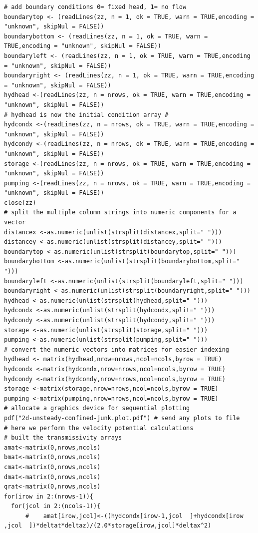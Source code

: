 \begin{lstlisting}[caption= Listing for \textbf{R} implementation for unsteady unconfined flow using Jacobi iteration , label=lst:2DUnsteadyUnconfined]
# add boundary conditions 0= fixed head, 1= no flow
boundarytop <- (readLines(zz, n = 1, ok = TRUE, warn = TRUE,encoding = "unknown", skipNul = FALSE))
boundarybottom <- (readLines(zz, n = 1, ok = TRUE, warn = TRUE,encoding = "unknown", skipNul = FALSE))
boundaryleft <- (readLines(zz, n = 1, ok = TRUE, warn = TRUE,encoding = "unknown", skipNul = FALSE))
boundaryright <- (readLines(zz, n = 1, ok = TRUE, warn = TRUE,encoding = "unknown", skipNul = FALSE))
hydhead <-(readLines(zz, n = nrows, ok = TRUE, warn = TRUE,encoding = "unknown", skipNul = FALSE))
# hydhead is now the initial condition array #
hydcondx <-(readLines(zz, n = nrows, ok = TRUE, warn = TRUE,encoding = "unknown", skipNul = FALSE))
hydcondy <-(readLines(zz, n = nrows, ok = TRUE, warn = TRUE,encoding = "unknown", skipNul = FALSE))
storage <-(readLines(zz, n = nrows, ok = TRUE, warn = TRUE,encoding = "unknown", skipNul = FALSE))
pumping <-(readLines(zz, n = nrows, ok = TRUE, warn = TRUE,encoding = "unknown", skipNul = FALSE)) 
close(zz)
# split the multiple column strings into numeric components for a vector
distancex <-as.numeric(unlist(strsplit(distancex,split=" ")))
distancey <-as.numeric(unlist(strsplit(distancey,split=" ")))
boundarytop <-as.numeric(unlist(strsplit(boundarytop,split=" ")))
boundarybottom <-as.numeric(unlist(strsplit(boundarybottom,split=" ")))
boundaryleft <-as.numeric(unlist(strsplit(boundaryleft,split=" ")))
boundaryright <-as.numeric(unlist(strsplit(boundaryright,split=" ")))
hydhead <-as.numeric(unlist(strsplit(hydhead,split=" ")))
hydcondx <-as.numeric(unlist(strsplit(hydcondx,split=" ")))
hydcondy <-as.numeric(unlist(strsplit(hydcondy,split=" ")))
storage <-as.numeric(unlist(strsplit(storage,split=" ")))
pumping <-as.numeric(unlist(strsplit(pumping,split=" ")))
# convert the numeric vectors into matrices for easier indexing
hydhead <- matrix(hydhead,nrow=nrows,ncol=ncols,byrow = TRUE)
hydcondx <-matrix(hydcondx,nrow=nrows,ncol=ncols,byrow = TRUE)
hydcondy <-matrix(hydcondy,nrow=nrows,ncol=ncols,byrow = TRUE)
storage <-matrix(storage,nrow=nrows,ncol=ncols,byrow = TRUE)
pumping <-matrix(pumping,nrow=nrows,ncol=ncols,byrow = TRUE)
# allocate a graphics device for sequential plotting
pdf("2d-unsteady-confined-junk.plot.pdf") # send any plots to file
# here we perform the velocity potential calculations
# built the transmissivity arrays
amat<-matrix(0,nrows,ncols) 
bmat<-matrix(0,nrows,ncols) 
cmat<-matrix(0,nrows,ncols)
dmat<-matrix(0,nrows,ncols)
qrat<-matrix(0,nrows,ncols)
for(irow in 2:(nrows-1)){
  for(jcol in 2:(ncols-1)){
      #    amat[irow,jcol]<-((hydcondx[irow-1,jcol  ]+hydcondx[irow  ,jcol  ])*deltat*deltaz)/(2.0*storage[irow,jcol]*deltax^2)

\end{lstlisting}
